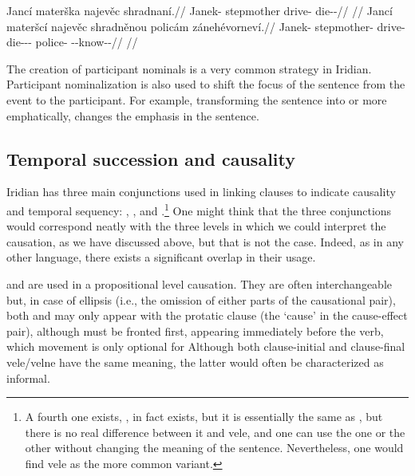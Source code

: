 \pex
\a\begingl
    \gla Jancí materška najevěc shradnaní.//
    \glb Janek-\Gen{} stepmother drive-\Cv{} die-\Pv{}-\Ret{}//
    \glft {}//
\endgl
\a\begingl
    \gla Jancí materšcí najevěc shradněnou policám zánehévorneví.//
    \glb Janek-\Gen{} stepmother-\Gen{} drive-\Cv{} die-\Pv{}-\Ret{}-\Nz{} police-\Agt{} \Neg{}-\Caus{}-know-\Pv{}-\Cont{}//
    \glft {}//
\endgl
\xe

The creation of participant nominals is a very common strategy in Iridian.
Participant nominalization is also used to shift the focus of the sentence from
the event to the participant. For example, transforming the sentence  into  or more
emphatically,  changes the emphasis
in the sentence.

\subsection{Temporal succession and causality}

Iridian has three main conjunctions used in linking clauses to indicate
causality and temporal sequency: , , and
.\footnote{A fourth one exists, , in fact exists, but it is
essentially the same as , but there is no real difference between it
and vele, and one can use the one or the other without changing the meaning of
the sentence. Nevertheless, one would find vele as the more common variant.} One
might think that the three conjunctions would correspond neatly with the three
levels in which we could interpret the causation, as we have discussed above,
but that is not the case. Indeed, as in any other language, there exists a
significant overlap in their usage.

 and  are used in a propositional level causation.
They are often interchangeable but, in case of ellipsis (i.e., the omission of
either parts of the causational pair), both  and  may
only appear with the protatic clause (the `cause' in the cause-effect pair),
although  must be fronted first, appearing immediately before the
verb, which movement is only optional for  Although both
clause-initial and clause-final vele/velne have the same meaning, the latter
would often be characterized as informal.


